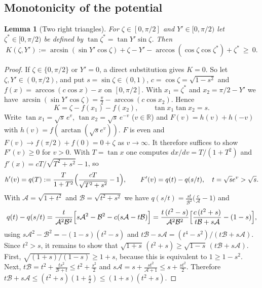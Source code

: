 \documentclass[11pt]{article}
\newtheorem{lemma}[theorem]{Lemma}
\theoremstyle{remark}
\begin{document}
\subsection{Monotonicity of the potential}
\begin{lemma}[Two right triangles]\label{lem:K}
For $\zeta\in[0,\pi/2]$ and $Y'\in[0,\pi/2)$ let $\zeta^*\in[0,\pi/2)$ be
defined by $\tan\zeta^*=\tan Y'\sin\zeta$. Then
\[
K(\zeta,Y'):=\arcsin(\sin Y'\cos\zeta)+\zeta-Y'
-\arccos(\cos\zeta\cos\zeta^*)+\zeta^*\ \ge\ 0 .
\]
\end{lemma}
\begin{proof}
If $\zeta\in\{0,\pi/2\}$ or $Y'=0$, a direct substitution gives $K=0$.
So let $\zeta,Y'\in(0,\pi/2)$, and put $s=\sin\zeta\in(0,1)$,
$c=\cos\zeta=\sqrt{1-s^2}$ and $f(x)=\arccos(c\cos x)-x$ on
$[0,\pi/2]$. With $x_1=\zeta^*$ and $x_2=\pi/2-Y'$ we have
$\arcsin(\sin Y'\cos\zeta)=\frac\pi2-\arccos(c\cos x_2)$. Hence
\[
K=\zeta-f(x_1)-f(x_2),\qquad \tan x_1\tan x_2=s .
\]
Write $\tan x_1=\sqrt s\,e^{v}$, $\tan x_2=\sqrt s\,e^{-v}$ ($v\in\mathbb R$)
and $F(v)=h(v)+h(-v)$ with $h(v)=f(\arctan(\sqrt s e^v))$. $F$ is
even and $F(v)\to f(\pi/2)+f(0)=0+\zeta$ as $v\to\infty$. It therefore suffices to show
$F'(v)\ge0$ for $v>0$. With $T=\tan x$ one computes
$dx/dv=T/(1+T^2)$ and $f'(x)=cT/\sqrt{T^2+s^2}-1$, so
\[
h'(v)=q(T):=\frac{T}{1+T^2}\Bigl(\frac{cT}{\sqrt{T^2+s^2}}-1\Bigr),\qquad
F'(v)=q(t)-q(s/t),\quad t=\sqrt s e^v>\sqrt s .
\]
With $\mathcal A=\sqrt{1+t^2}$ and $\mathcal B=\sqrt{t^2+s^2}$ we have
$q(s/t)=\frac{st}{\mathcal B^2}\bigl(\frac{c}{\mathcal A}-1\bigr)$ and
\[
q(t)-q(s/t)=\frac{t}{\mathcal A^2\mathcal B^2}\Bigl[s\mathcal A^2-\mathcal B^2-c(s\mathcal A-t\mathcal B)\Bigr]
=\frac{t\,(t^2-s)}{\mathcal A^2\mathcal B^2}\Bigl[\frac{c\,(t^2+s)}{t\mathcal B+s\mathcal A}-(1-s)\Bigr],
\]
using $s\mathcal A^2-\mathcal B^2=-(1-s)(t^2-s)$ and
$t\mathcal B-s\mathcal A=(t^4-s^2)/(t\mathcal B+s\mathcal A)$.
Since $t^2>s$, it remains to show that
$\sqrt{1+s}\,(t^2+s)\ge\sqrt{1-s}\,(t\mathcal B+s\mathcal A)$.
First, $\sqrt{(1+s)/(1-s)}\ge1+s$, because this is equivalent to $1\ge1-s^2$. Next,
$t\mathcal B=t^2+\frac{ts^2}{\mathcal B+t}\le t^2+\frac{s^2}2$ and
$s\mathcal A=s+\frac{st^2}{\mathcal A+1}\le s+\frac{st^2}2$. Therefore
$t\mathcal B+s\mathcal A\le(t^2+s)(1+\frac s2)\le(1+s)(t^2+s)$.
\end{proof}
\end{document}
